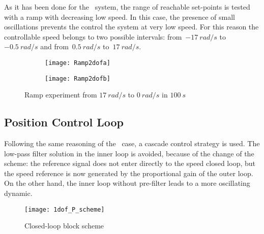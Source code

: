 As it has been done for the \onedof\ system, the range of reachable set-points is tested with a ramp with decreasing low speed. In this case, the presence of small oscillations prevents the control the system at very low speed. For this reason the controllable speed belongs to two possible intervals: from~$-17\ rad/s$ to~$-0.5\ rad/s$ and from~$0.5\ rad/s$ to~$17\ rad/s$.
\begin{figure*}[h]
	\centering
	\begin{subfigure}{0.45\columnwidth}
		\texttt{[image: Ramp2dofa]}
	\end{subfigure}
	\begin{subfigure}{0.45\columnwidth}
		\texttt{[image: Ramp2dofb]}
	\end{subfigure}

	\caption{Ramp experiment from $17\ rad/s$ to $0\ rad/s$ in $100\ s$}
	\label{fig:Ramp2dof}
\end{figure*}

\newpage
\subsection{Position Control Loop}

Following the same reasoning of the \onedof~case, a cascade control strategy is used. The low-pass filter solution in the inner loop is avoided, because of the change of the scheme: the reference signal does not enter directly to the speed closed loop, but the speed reference is now generated by the proportional gain of the outer loop. On the other hand, the inner loop without pre-filter leads to a more oscillating dynamic. 

\begin{figure*}[h]
	\centering
	\texttt{[image: 1dof\_P\_scheme]}
	\label{fig:Closed-loop block scheme2}
	\caption{Closed-loop block scheme}
\end{figure*}

